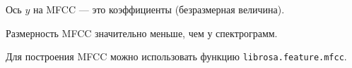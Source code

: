 \begin{remark}
    Ось $y$ на MFCC --- это коэффициенты (безразмерная величина).
\end{remark}

\begin{remark}
    Размерность MFCC значительно меньше, чем у спектрограмм.
\end{remark}

\begin{remark}
    Для построения MFCC можно использовать функцию \texttt{librosa.feature.mfcc}.
\end{remark}
